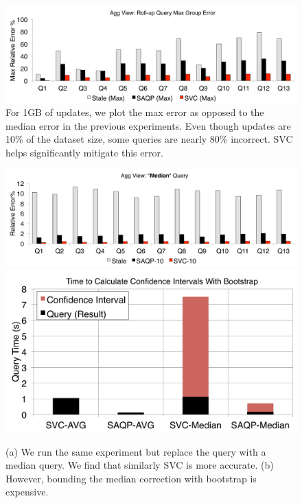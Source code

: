 \begin{figure}[t]
\centering
\includegraphics[scale=0.17]{exp/msdc_4.pdf}
   \caption{For 1GB of updates, we plot the max error as opposed to the median error in the previous experiments. Even though updates are 10\% of the dataset size, some queries are nearly 80\% incorrect. SVC helps significantly mitigate this error. \label{exp2-max}}
\end{figure}

\begin{figure}[t]
\centering
  \includegraphics[scale=0.17]{exp/msdc_5.pdf}
  \includegraphics[scale=0.20]{exp/msdc_6.pdf}
 \caption{(a) We run the same experiment but replace the \sumfunc query with a median query. We find that similarly SVC is more accurate. (b) However, bounding the median correction with bootstrap is expensive. \label{exp2-median}}
\end{figure}


